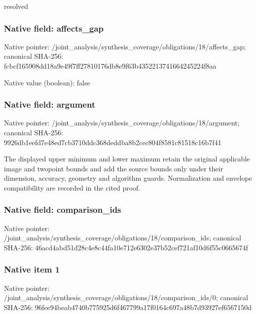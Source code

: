 \documentclass[10pt,a4paper]{article}
\begin{document}
resolved


\subsubsection{Native field: affects\_gap}


Native pointer: /joint\_analysis/synthesi\allowbreak{}s\_coverage/obligations/1\allowbreak{}8/affects\_gap; canonical SHA-256: fcbcf165908dd18a9e49f7ff\allowbreak{}27810176db8e9f63b4352213\allowbreak{}741664245224f8aa



Native value (boolean): false



\subsubsection{Native field: argument}


Native pointer: /joint\_analysis/synthesi\allowbreak{}s\_coverage/obligations/1\allowbreak{}8/argument; canonical SHA-256: 9926db1eefd7e48ed7cb3710\allowbreak{}ddc368deddba8b2cec804f85\allowbreak{}81c81518c16b7f41


The displayed upper minimum and lower maximum retain the original applicable image and twopoint bounds and add the source bounds only under their dimension, accuracy, geometry and algorithm guards. Normalization and envelope compatibility are recorded in the cited proof.


\subsubsection{Native field: comparison\_ids}


Native pointer: /joint\_analysis/synthesi\allowbreak{}s\_coverage/obligations/1\allowbreak{}8/comparison\_ids; canonical SHA-256: 46acd4abd51d28c4e8c44fa1\allowbreak{}0e712e6302e37b52cef721af\allowbreak{}10d6f55c0665674f



\subsubsection{Native item 1}


Native pointer: /joint\_analysis/synthesi\allowbreak{}s\_coverage/obligations/1\allowbreak{}8/comparison\_ids/0; canonical SHA-256: 96fee94beab4740b775925d6\allowbreak{}f467799a17f0164c697a48b7\allowbreak{}d93927ef6567150d
\end{document}
